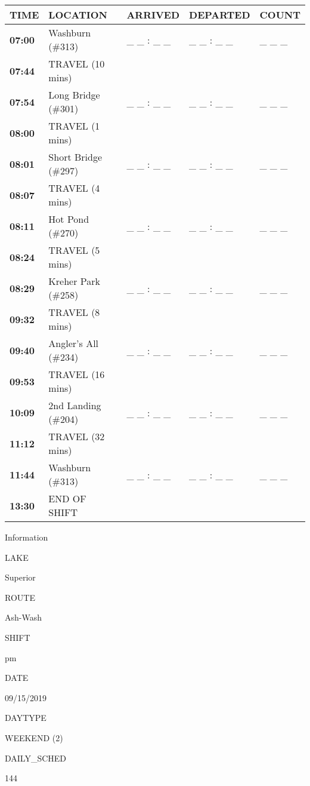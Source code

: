 \documentclass[]{article}
\begin{document}
\begin{tabular}{>{\bfseries}lllll}
\toprule
\textbf{TIME} & \textbf{LOCATION} & \textbf{ARRIVED} & \textbf{DEPARTED} & \textbf{COUNT}\\
\midrule
07:00 & Washburn (\#313) & \_ \_ : \_ \_ & \_ \_ : \_ \_ & \_ \_ \_\\
07:44 & TRAVEL (10 mins) &  &  & \\
07:54 & Long Bridge (\#301) & \_ \_ : \_ \_ & \_ \_ : \_ \_ & \_ \_ \_\\
08:00 & TRAVEL (1 mins) &  &  & \\
08:01 & Short Bridge (\#297) & \_ \_ : \_ \_ & \_ \_ : \_ \_ & \_ \_ \_\\
08:07 & TRAVEL (4 mins) &  &  & \\
08:11 & Hot Pond (\#270) & \_ \_ : \_ \_ & \_ \_ : \_ \_ & \_ \_ \_\\
08:24 & TRAVEL (5 mins) &  &  & \\
08:29 & Kreher Park (\#258) & \_ \_ : \_ \_ & \_ \_ : \_ \_ & \_ \_ \_\\
09:32 & TRAVEL (8 mins) &  &  & \\
09:40 & Angler's All (\#234) & \_ \_ : \_ \_ & \_ \_ : \_ \_ & \_ \_ \_\\
09:53 & TRAVEL (16 mins) &  &  & \\
10:09 & 2nd Landing (\#204) & \_ \_ : \_ \_ & \_ \_ : \_ \_ & \_ \_ \_\\
11:12 & TRAVEL (32 mins) &  &  & \\
11:44 & Washburn (\#313) & \_ \_ : \_ \_ & \_ \_ : \_ \_ & \_ \_ \_\\
13:30 & END OF SHIFT &  &  & \\
\bottomrule
\end{tabular}\newpage

Information

LAKE

Superior

ROUTE

Ash-Wash

SHIFT

pm

DATE

09/15/2019

DAYTYPE

WEEKEND (2)

DAILY\_SCHED

144

\vspace{24pt}
\end{document}
